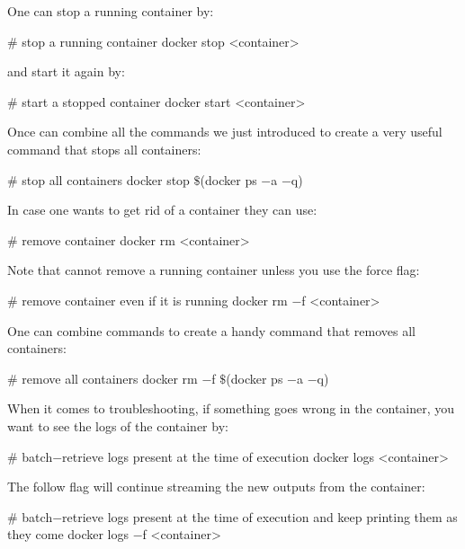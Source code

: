 
One can stop a running container by:

\begin{bash}
# stop a running container
docker stop <container>
\end{bash}

and start it again by:

\begin{bash}
# start a stopped container
docker start <container>
\end{bash}

Once can combine all the commands we just introduced to create a very useful command that stops all containers:

\begin{bash}
# stop all containers
docker stop $\$$(docker ps $-$a $-$q)
\end{bash}

In case one wants to get rid of a container they can use:

\begin{bash}
# remove container
docker rm <container>
\end{bash}

Note that  cannot remove a running container unless you use the force  flag:

\begin{bash}
# remove container even if it is running
docker rm $-$f <container>
\end{bash}

One can combine commands to create a handy command that removes all containers:

\begin{bash}
# remove all containers
docker rm $-$f $\$$(docker ps $-$a $-$q)
\end{bash}

When it comes to troubleshooting, if something goes wrong in the container, you want to see the logs of the container
by:

\begin{bash}
# batch$-$retrieve logs present at the time of execution
docker logs <container>
\end{bash}

The follow  flag will continue streaming the new outputs from the container:

\begin{bash}
# batch$-$retrieve logs present at the time of execution and keep printing them as they come
docker logs $-$f <container>
\end{bash}

